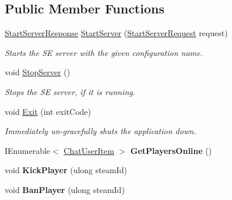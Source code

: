 \subsection*{Public Member Functions}
\begin{DoxyCompactItemize}
\item 
\hyperlink{class_s_e_comm_1_1_start_server_response}{Start\+Server\+Response} \hyperlink{class_s_e_server_extender_1_1_server_service_1_1_server_service_a28b157cacb532e4a5149e2fb234eb253}{Start\+Server} (\hyperlink{class_s_e_comm_1_1_start_server_request}{Start\+Server\+Request} request)
\begin{DoxyCompactList}\small\item\em Starts the S\+E server with the given configuration name. \end{DoxyCompactList}\item 
void \hyperlink{class_s_e_server_extender_1_1_server_service_1_1_server_service_a2bc751bdb04de0a8cb7ba76c4d02fc13}{Stop\+Server} ()
\begin{DoxyCompactList}\small\item\em Stops the S\+E server, if it is running. \end{DoxyCompactList}\item 
void \hyperlink{class_s_e_server_extender_1_1_server_service_1_1_server_service_a03dff0c8a36f28e65a17f7d711c97496}{Exit} (int exit\+Code)
\begin{DoxyCompactList}\small\item\em Immediately un-\/gracefully shuts the application down. \end{DoxyCompactList}\item 
\hypertarget{class_s_e_server_extender_1_1_server_service_1_1_server_service_a446718001a4a356fd7c97c95625e3dc6}{}I\+Enumerable$<$ \hyperlink{class_s_e_mod_a_p_i_internal_1_1_chat_user_item}{Chat\+User\+Item} $>$ {\bfseries Get\+Players\+Online} ()\label{class_s_e_server_extender_1_1_server_service_1_1_server_service_a446718001a4a356fd7c97c95625e3dc6}

\item 
\hypertarget{class_s_e_server_extender_1_1_server_service_1_1_server_service_a5f42d93fa845026710373d3d327e297b}{}void {\bfseries Kick\+Player} (ulong steam\+Id)\label{class_s_e_server_extender_1_1_server_service_1_1_server_service_a5f42d93fa845026710373d3d327e297b}

\item 
\hypertarget{class_s_e_server_extender_1_1_server_service_1_1_server_service_a1265393107b3253bad30729b3f58264f}{}void {\bfseries Ban\+Player} (ulong steam\+Id)\label{class_s_e_server_extender_1_1_server_service_1_1_server_service_a1265393107b3253bad30729b3f58264f}


\end{DoxyCompactItemize}

